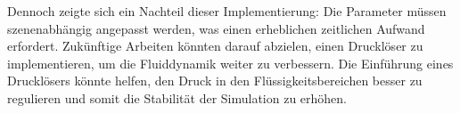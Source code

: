 \documentclass[a4paper, 12pt]{article}
\begin{document}
Dennoch zeigte sich ein Nachteil dieser Implementierung: Die Parameter müssen szenenabhängig angepasst werden, was einen erheblichen zeitlichen Aufwand erfordert. Zukünftige Arbeiten könnten darauf abzielen, einen Drucklöser zu implementieren, um die Fluiddynamik weiter zu verbessern. Die Einführung eines Drucklösers könnte helfen, den Druck in den Flüssigkeitsbereichen besser zu regulieren und somit die Stabilität der Simulation zu erhöhen.

\nocite{*}
\printbibliography[title={Bibliographie}]
\end{document}
